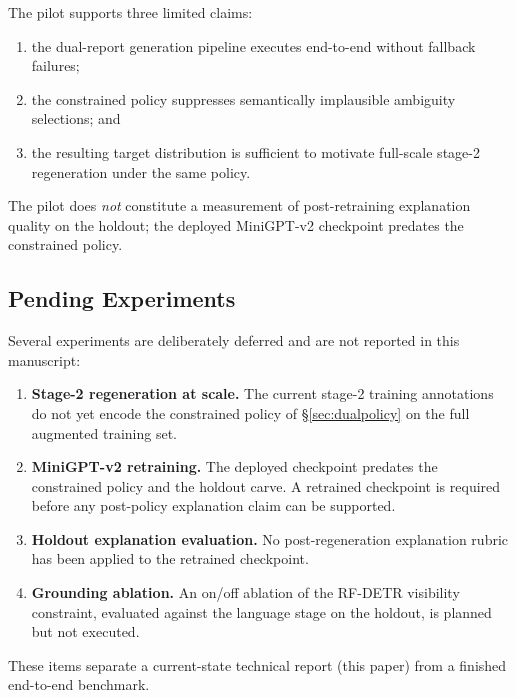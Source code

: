 The pilot supports three limited claims:
\begin{enumerate}[leftmargin=1.3em]
\item the dual-report generation pipeline executes end-to-end without
fallback failures;
\item the constrained policy suppresses semantically implausible
ambiguity selections; and
\item the resulting target distribution is sufficient to motivate
full-scale stage-2 regeneration under the same policy.
\end{enumerate}
The pilot does \emph{not} constitute a measurement of post-retraining
explanation quality on the holdout; the deployed MiniGPT-v2 checkpoint
predates the constrained policy.

\subsection{Pending Experiments}
\label{sec:results-pending}

Several experiments are deliberately deferred and are not reported in
this manuscript:

\begin{enumerate}[leftmargin=1.3em]
\item \textbf{Stage-2 regeneration at scale.} The current stage-2
training annotations do not yet encode the constrained policy of
\S\ref{sec:dualpolicy} on the full augmented training set.
\item \textbf{MiniGPT-v2 retraining.} The deployed checkpoint predates
the constrained policy and the holdout carve. A retrained checkpoint is
required before any post-policy explanation claim can be supported.
\item \textbf{Holdout explanation evaluation.} No post-regeneration
explanation rubric has been applied to the retrained checkpoint.
\item \textbf{Grounding ablation.} An on/off ablation of the RF-DETR
visibility constraint, evaluated against the language stage on the
holdout, is planned but not executed.
\end{enumerate}

These items separate a current-state technical report (this paper) from
a finished end-to-end benchmark.
